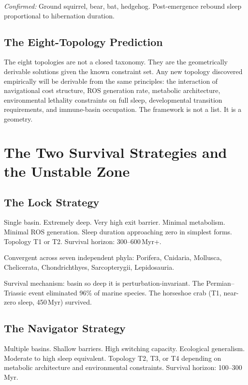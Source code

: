 \documentclass[10pt, a4paper]{article}
\begin{document}
\textit{Confirmed:} Ground squirrel,
bear, bat, hedgehog. Post-emergence
rebound sleep proportional to
hibernation duration.

\subsection{The Eight-Topology Prediction}

The eight topologies are not a closed
taxonomy. They are the geometrically
derivable solutions given the known
constraint set. Any new topology
discovered empirically will be derivable
from the same principles: the interaction
of navigational cost structure, ROS
generation rate, metabolic architecture,
environmental lethality constraints on
full sleep, developmental transition
requirements, and immune-basin
occupation. The framework is not a
list. It is a geometry.

\section{The Two Survival Strategies
and the Unstable Zone}
\label{sec:strategies}

\subsection{The Lock Strategy}

Single basin. Extremely deep. Very high
exit barrier. Minimal metabolism. Minimal
ROS generation. Sleep duration approaching
zero in simplest forms. Topology T1 or T2.
Survival horizon: 300--600\,Myr+.

Convergent across seven independent
phyla: Porifera, Cnidaria, Mollusca,
Chelicerata, Chondrichthyes,
Sarcopterygii, Lepidosauria.

Survival mechanism: basin so deep it
is perturbation-invariant. The Permian--
Triassic event eliminated 96\% of
marine species. The horseshoe crab
(T1, near-zero sleep, 450\,Myr) survived.

\subsection{The Navigator Strategy}

Multiple basins. Shallow barriers.
High switching capacity. Ecological
generalism. Moderate to high sleep
equivalent. Topology T2, T3, or T4
depending on metabolic architecture and
environmental constraints. Survival
horizon: 100--300\,Myr.
\end{document}
